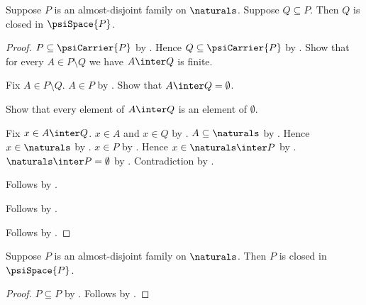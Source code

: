 \begin{theorem}\label{psi_family_subsets_closed}
    Suppose $P$ is an almost-disjoint family on $\naturals$.
    Suppose $Q\subseteq P$.
    Then $Q$ is closed in $\psiSpace{P}$.
\end{theorem}
\begin{proof}
    $P\subseteq\psiCarrier{P}$ by .
    Hence $Q\subseteq\psiCarrier{P}$ by .
    Show that for every $A\in P\setminus Q$ we have
        $A\inter Q$ is finite.
    \begin{subproof}
        Fix $A\in P\setminus Q$.
        $A\in P$ by .
        Show that $A\inter Q=\emptyset$.
        \begin{subproof}
            Show that every element of $A\inter Q$ is an element of
                $\emptyset$.
            \begin{subproof}
                Fix $x\in A\inter Q$.
                $x\in A$ and $x\in Q$ by .
                $A\subseteq\naturals$ by
                    .
                Hence $x\in\naturals$ by .
                $x\in P$ by .
                Hence $x\in\naturals\inter P$ by .
                $\naturals\inter P=\emptyset$ by
                    .
                Contradiction by .
            \end{subproof}
            Follows by .
        \end{subproof}
        Follows by .
    \end{subproof}
    Follows by .
\end{proof}

\begin{proposition}\label{psi_family_closed}
    Suppose $P$ is an almost-disjoint family on $\naturals$.
    Then $P$ is closed in $\psiSpace{P}$.
\end{proposition}
\begin{proof}
    $P\subseteq P$ by .
    Follows by .
\end{proof}

